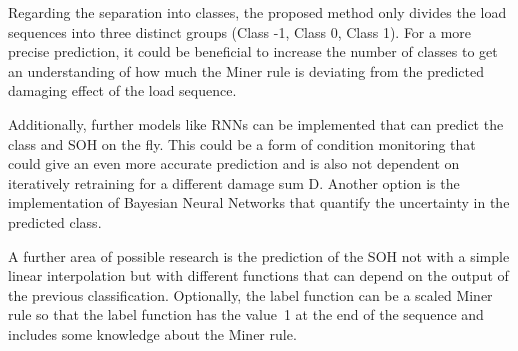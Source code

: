Regarding the separation into classes, the proposed method only divides the load sequences into three distinct groups (Class -1, Class 0, Class 1). For a more precise prediction, it could be beneficial to increase the number of classes to get an understanding of how much the Miner rule is deviating from the predicted damaging effect of the load sequence.

Additionally, further models like RNNs can be implemented that can predict the class and SOH on the fly. This could be a form of condition monitoring that could give an even more accurate prediction and is also not dependent on iteratively retraining for a different damage sum D. Another option is the implementation of Bayesian Neural Networks that quantify the uncertainty in the predicted class. 

A further area of possible research is the prediction of the SOH not with a simple linear interpolation but with different functions that can depend on the output of the previous classification. Optionally, the label function can be a scaled Miner rule so that the label function has the value~1 at the end of the sequence and includes some knowledge about the Miner rule.  

\afterpage{\null\newpage}
